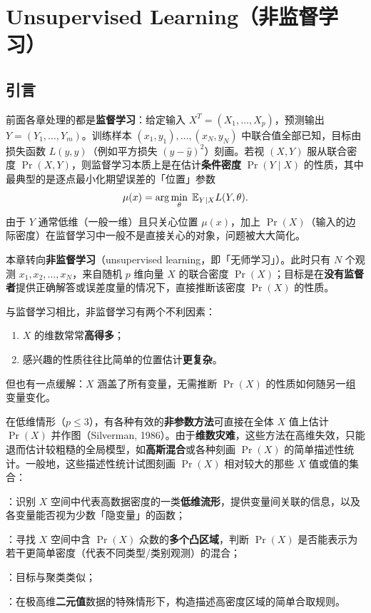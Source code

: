 \chapter{Unsupervised Learning（非监督学习）}

\section{引言}

\begin{remark}[监督学习回顾]
前面各章处理的都是\textbf{监督学习}：给定输入 $X^T=(X_1,\dots,X_p)$，预测输出 $Y=(Y_1,\dots,Y_m)$。训练样本 $(x_1,y_1),\dots,(x_N,y_N)$ 中联合值全部已知，目标由损失函数 $L(y,\hat y)$（例如平方损失 $(y-\hat y)^2$）刻画。若视 $(X,Y)$ 服从联合密度 $\Pr(X,Y)$，则监督学习本质上是在估计\textbf{条件密度} $\Pr(Y\mid X)$ 的性质，其中最典型的是逐点最小化期望误差的「位置」参数
\begin{equation}
\mu(x) = \arg\min_{\theta}\; \mathbb{E}_{Y\mid X} L(Y,\theta). \label{eq:14_1}
\end{equation}
由于 $Y$ 通常低维（一般一维）且只关心位置 $\mu(x)$，加上 $\Pr(X)$（输入的边际密度）在监督学习中一般不是直接关心的对象，问题被大大简化。
\end{remark}

本章转向\textbf{非监督学习}（unsupervised learning，即「无师学习」）。此时只有 $N$ 个观测 $x_1,x_2,\dots,x_N$，来自随机 $p$ 维向量 $X$ 的联合密度 $\Pr(X)$；目标是在\textbf{没有监督者}提供正确解答或误差度量的情况下，直接推断该密度 $\Pr(X)$ 的性质。

与监督学习相比，非监督学习有两个不利因素：
\begin{enumerate}[itemsep=1pt]
\item $X$ 的维数常常\textbf{高得多}；
\item 感兴趣的性质往往比简单的位置估计\textbf{更复杂}。
\end{enumerate}
但也有一点缓解：$X$ 涵盖了所有变量，无需推断 $\Pr(X)$ 的性质如何随另一组变量变化。

在低维情形（$p\le 3$），有各种有效的\textbf{非参数方法}可直接在全体 $X$ 值上估计 $\Pr(X)$ 并作图（Silverman, 1986）。由于\textbf{维数灾难}，这些方法在高维失效，只能退而估计较粗糙的全局模型，如\textbf{高斯混合}或各种刻画 $\Pr(X)$ 的简单描述性统计。一般地，这些描述性统计试图刻画 $\Pr(X)$ 相对较大的那些 $X$ 值或值的集合：

\begin{description}[itemsep=1pt]
\item[主成分、多维缩放（MDS）、自组织映射（SOM）、主曲线]：识别 $X$ 空间中代表高数据密度的一类\textbf{低维流形}，提供变量间关联的信息，以及各变量能否视为少数「隐变量」的函数；
\item[聚类分析]：寻找 $X$ 空间中含 $\Pr(X)$ 众数的\textbf{多个凸区域}，判断 $\Pr(X)$ 是否能表示为若干更简单密度（代表不同类型/类别观测）的混合；
\item[混合建模]：目标与聚类类似；
\item[关联规则]：在极高维\textbf{二元值}数据的特殊情形下，构造描述高密度区域的简单合取规则。
\end{description}

